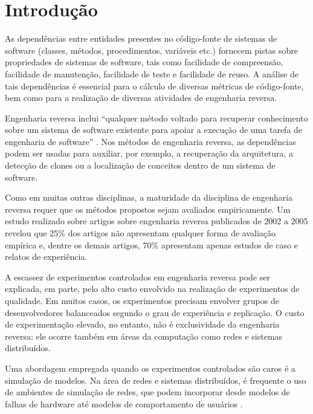 %

\chapter{Introdução}


As dependências entre entidades presentes no código-fonte de sistemas de software (classes, métodos, procedimentos, variáveis etc.) fornecem pistas sobre propriedades de sistemas de software, tais como facilidade de compreensão, facilidade de manutenção, facilidade de teste e facilidade de reuso. 
A análise de tais dependências é essencial para o cálculo de diversas métricas de código-fonte, bem como para a realização de diversas atividades de engenharia reversa.

Engenharia reversa inclui ``qualquer método voltado para recuperar conhecimento sobre um sistema de software existente para apoiar a execução de uma tarefa de engenharia de software'' \cite{Tonella2007}. Nos métodos de engenharia reversa, as dependências podem ser usadas para auxiliar, por exemplo, a recuperação da arquitetura, a detecção de clones ou a localização de conceitos dentro de um sistema de software. 

Como em muitas outras disciplinas, a maturidade da disciplina de engenharia reversa requer que os métodos propostos sejam avaliados empiricamente. Um estudo realizado sobre artigos sobre engenharia reversa publicados de 2002 a 2005 revelou que 25\% dos artigos não apresentam qualquer forma de avaliação empírica e, dentre os demais artigos, 70\% apresentam apenas estudos de caso e relatos de experiência.

A escassez de experimentos controlados em engenharia reversa pode ser explicada, em parte, pelo alto custo envolvido na realização de experimentos de qualidade. Em muitos casos, os experimentos precisam envolver grupos de desenvolvedores balanceados segundo o grau de experiência e replicação. O custo de experimentação elevado, no entanto, não é exclusividade da engenharia reversa: ele ocorre também em áreas da computação como redes e sistemas distribuídos.

Uma abordagem empregada quando os experimentos controlados são caros é a simulação de modelos. Na área de redes e sistemas distribuídos, é frequente o uso de ambientes de simulação de redes, que podem incorporar desde modelos de falhas de hardware até modelos de comportamento de usuários \cite{XXX}.

